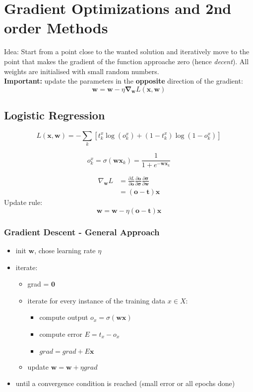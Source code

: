 \section{Gradient Optimizations and 2nd order Methods}
\label{sect:gradient-optimization-and-2nd-order-methods}
Idea: Start from a point close to the wanted solution and iteratively move to the point that makes the gradient of the function approache zero (hence \textit{decent}). All weights are initialised with small random numbers.\\
\textbf{Important:} update the parameters in the \textbf{opposite} direction of the gradient:
\[
\mathbf{w} = \mathbf{w} - \eta \mathbf{\nabla}_{\mathbf{w}} L(\mathbf{x}, \mathbf{w})
\]

\subsection{Logistic Regression}
\label{ssect:logistic-regression}
\[
L(\mathbf{x}, \mathbf{w}) = - \sum_k [t_k^x \log(o_k^x) + (1-t_k^x) \log(1-o_k^x)]
\]

\[
o_k^x = \sigma(\mathbf{w} \mathbf{x}_k) = \frac{1}{1 + e^{-\mathbf{w}\mathbf{x}_k}}
\]

\begin{align*}
\nabla_{\mathbf{w}} L &= \frac{\partial L}{\partial \mathbf{o}} \frac{\partial \mathbf{o}}{\partial \mathbf{\sigma}} \frac{\partial \mathbf{\sigma}}{\partial \mathbf{w}} \\
&= (\mathbf{o} - \mathbf{t}) \mathbf{x}
\end{align*}
Update rule:
\[
\mathbf{w} = \mathbf{w} - \eta(\mathbf{o} - \mathbf{t}) \mathbf{x}
\]

\subsubsection{Gradient Descent - General Approach}
\label{sssect:gradient-descent}
\begin{itemize}
	\item init $\mathbf{w}$, chose learning rate $\eta$
	\item iterate:
		\begin{itemize}
			\item grad = $\mathbf{0}$
			\item iterate for every instance of the training data $x \in X$:
				\begin{itemize}
					\item compute output $o_x = \sigma (\mathbf{w} \mathbf{x})$
					\item compute error $E = t_x - o_x$
					\item $grad = grad + E \mathbf{x}$
				\end{itemize}
			\item update $\mathbf{w} = \mathbf{w} + \eta grad$
		\end{itemize}
	\item until a convergence condition is reached (small error or all epochs done)
\end{itemize}

